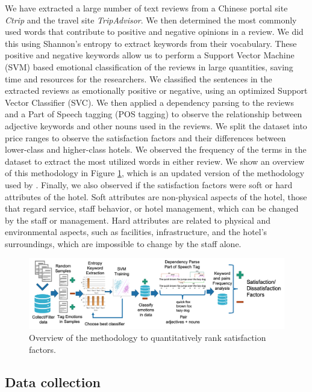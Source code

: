 \documentclass[smallextended,natbib]{svjour3}       %
\begin{document}
  We have extracted a large number of text reviews from a Chinese portal site \textit{Ctrip} and the travel site \textit{TripAdvisor}. We then determined the most commonly used words that contribute to positive and negative opinions in a review. We did this using Shannon's entropy to extract keywords from their vocabulary. These positive and negative keywords allow us to perform a Support Vector Machine (SVM) based emotional classification of the reviews in large quantities, saving time and resources for the researchers. We classified the sentences in the extracted reviews as emotionally positive or negative, using an optimized Support Vector Classifier (SVC). We then applied a dependency parsing to the reviews and a Part of Speech tagging (POS tagging) to observe the relationship between adjective keywords and other nouns used in the reviews. We split the dataset into price ranges to observe the satisfaction factors and their differences between lower-class and higher-class hotels. We observed the frequency of the terms in the dataset to extract the most utilized words in either review. We show an overview of this methodology in Figure \ref{fig:method-overview}, which is an updated version of the methodology used by \cite{Aleman2018ICAROB}. Finally, we also observed if the satisfaction factors were soft or hard attributes of the hotel. Soft attributes are non-physical aspects of the hotel, those that regard service, staff behavior, or hotel management, which can be changed by the staff or management. Hard attributes are related to physical and environmental aspects, such as facilities,  infrastructure, and the hotel's surroundings, which are impossible to change by the staff alone.

  \begin{figure}[bp]
  \centering
  \includegraphics[width=\textwidth]{emotion-method-overview_V3.png}
  \caption{Overview of the methodology to quantitatively rank satisfaction factors.}
  \label{fig:method-overview}
  \end{figure}

  \subsection{Data collection}\label{datacollection}
\end{document}
